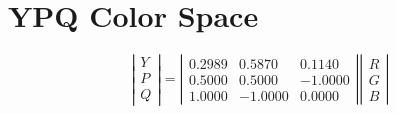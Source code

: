 \documentclass{article}
\begin{document}
\section{YPQ Color Space}
\cite{journals/pr/GrundlandD07} 
\begin{equation}
\left| \begin{array}{c} Y \\ P \\ Q \end{array} \right| = 
\left| \begin{array}{ccc}
0.2989 & 0.5870 & 0.1140 \\
0.5000 & 0.5000 & -1.0000\\
1.0000 & -1.0000&  0.0000
\end{array} \right|
\left|\begin{array}{c} R \\ G \\ B \end{array} \right|
\end{equation}





\end{document}
